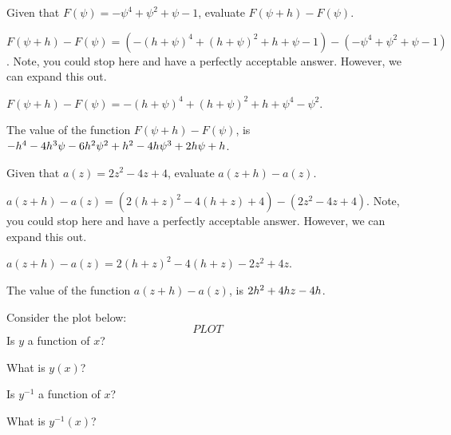 \begin{shuffle}
\begin{exercise}
Given that $F(\psi)=-\psi ^4+\psi ^2+\psi -1$, evaluate $F(\psi+h)-F(\psi)$.
\begin{solution}
\begin{hint}
$F(\psi+h)-F(\psi)=(-(h+\psi )^4+(h+\psi )^2+h+\psi -1)-(-\psi ^4+\psi ^2+\psi -1)$. Note, you could stop here and have a perfectly acceptable answer. However, we can expand this out.
\end{hint}
\begin{hint}
$F(\psi+h)-F(\psi)=-(h+\psi )^4+(h+\psi )^2+h+\psi ^4-\psi ^2$.
\end{hint}
The value of the function $F(\psi+h)-F(\psi)$, is ${-h^4-4 h^3 \psi -6 h^2 \psi ^2+h^2-4 h \psi ^3+2 h \psi +h}$.
\end{solution}
\end{exercise}

\begin{exercise}
Given that $a(z)=2 z^2-4 z+4$, evaluate $a(z+h)-a(z)$.
\begin{solution}
\begin{hint}
$a(z+h)-a(z)=(2 (h+z)^2-4 (h+z)+4)-(2 z^2-4 z+4)$. Note, you could stop here and have a perfectly acceptable answer. However, we can expand this out.
\end{hint}
\begin{hint}
$a(z+h)-a(z)=2 (h+z)^2-4 (h+z)-2 z^2+4 z$.
\end{hint}
The value of the function $a(z+h)-a(z)$, is ${2 h^2+4 h z-4 h}$.
\end{solution}
\end{exercise}
\end{shuffle}



\begin{question}
Consider the plot below:
\[
PLOT
\]
Is $y$ a function of $x$? 
\begin{solution}
\end{solution}
What is $y(x)$?
\begin{solution}
\end{solution}
Is $y^{-1}$ a function of $x$? 
\begin{solution}
\end{solution}
What is $y^{-1}(x)$?
\begin{solution}
\end{solution}
\end{question}






